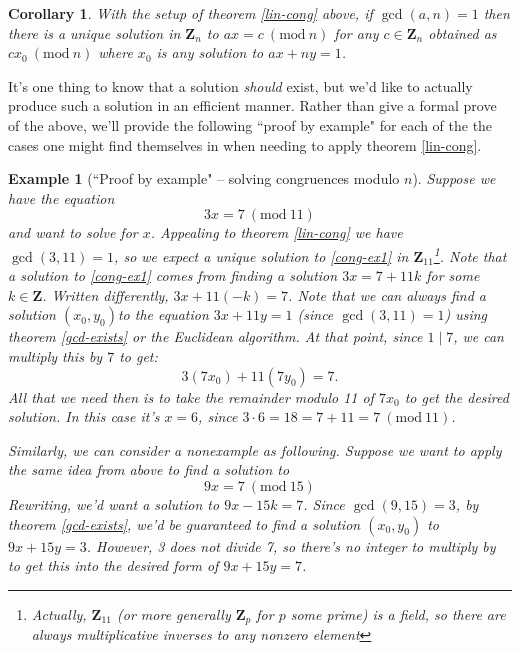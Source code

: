 \documentclass[12pt]{article}
\numberwithin{equation}{subsection}
\newtheorem{corollary}[subsection]{Corollary}
\theoremstyle{note}
\newtheorem{example}[subsection]{Example}
\newcommand{\Mod}[1]{\ (\mathrm{mod}\ #1)}
\begin{document}
\begin{corollary}
	With the setup of theorem \ref{lin-cong} above, if $\gcd(a,n)=1$ then there is a unique solution in $\mathbf{Z}_n$ to $ax=c\Mod{n}$ for any $c\in \mathbf{Z}_n$ obtained as $cx_0\Mod{n}$ where $x_0$ is any solution to $ax+ny=1$. 
\end{corollary}
It's one thing to know that a solution \textit{should} exist, but we'd like to actually produce such a solution in an efficient manner. Rather than give a formal prove of the above, we'll provide the following ``proof by example" for each of the the cases one might find themselves in when needing to apply theorem \ref{lin-cong}.

\begin{example}[``Proof by example" -- solving congruences modulo $n$]
Suppose we have the equation \begin{equation} \label{cong-ex1} 3x=7\Mod{11}\end{equation} and want to solve for $x$. Appealing to theorem \ref{lin-cong} we have $\gcd(3,11)=1$, so we expect a unique solution to \eqref{cong-ex1} in $\mathbf{Z}_{11}$\footnote{Actually, $\mathbf{Z}_{11}$ (or more generally $\mathbf{Z}_p$ for $p$ some prime) is a \textit{field}, so there are always multiplicative inverses to any nonzero element}.  Note that a solution to \eqref{cong-ex1} comes from finding a solution $3x=7+11k$ for some $k\in\mathbf{Z}$. Written differently, $3x+11(-k)=7$. Note that we can always find a solution $(x_0,y_0)$to the equation $3x+11y=1$ (since $\gcd(3,11)=1$) using theorem \ref{gcd-exists} or the Euclidean algorithm. At that point, since $1\mid 7$, we can multiply this by $7$ to get: \[ 3(7x_0)+11(7y_0)=7.\] All that we need then is to take the remainder modulo 11 of $7x_0$ to get the desired solution. In this case it's $x=6$, since $3\cdot 6=18=7+11=7\Mod{11}$.

Similarly, we can consider a nonexample as following. Suppose we want to apply the same idea from above to find a solution to \begin{equation} \label{cong-ex2} 9x=7\Mod{15}\end{equation} Rewriting, we'd want a solution to $9x-15k=7$. Since $\gcd(9,15)=3$, by theorem \ref{gcd-exists}, we'd be guaranteed to find a solution $(x_0,y_0)$ to $9x+15y=3$. However, 3 does not divide 7, so there's no integer to multiply by to get this into the desired form of $9x+15y=7$. 


\end{example}
\end{document}
